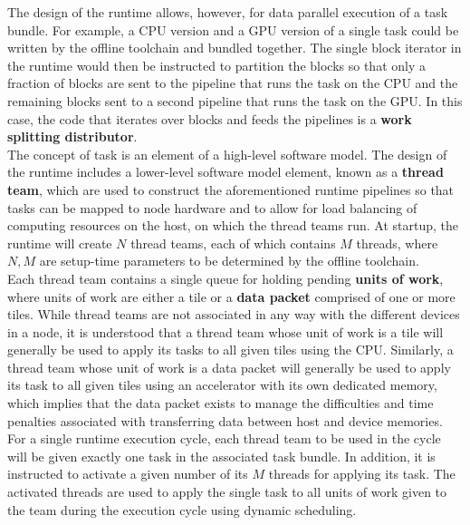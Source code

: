 \documentclass{article}
\begin{document}
The design of the runtime allows, however, for data parallel execution of a task
bundle.  For example, a CPU version and a GPU version of a single task could
be written by the offline toolchain and bundled together.  The single block
iterator in the runtime would then be instructed to partition the blocks so that
only a fraction of blocks are sent to the pipeline that runs the task on the
CPU and the remaining blocks sent to a second pipeline that runs the task on the
GPU.  In this case, the code that iterates over blocks and feeds the pipelines
is a \textbf{work splitting distributor}.\\

The concept of task is an element of a high-level software model.  The design of
the runtime includes a lower-level software model element, known as a
\textbf{thread team}, which are used to construct the aforementioned runtime
pipelines so that tasks can be mapped to node hardware and to allow for load
balancing of computing resources on the host, on which the thread teams run.
At startup, the runtime will create $N$ thread teams, each of which contains $M$
threads, where $N, M$ are setup-time parameters to be determined by the offline
toolchain.\\

Each thread team contains a single queue for holding pending \textbf{units of
work}, where units of work are either a tile or a \textbf{data packet} comprised
of one or more tiles.  While thread teams are not associated in any way with the
different devices in a node, it is understood that a thread team whose unit of
work is a tile will generally be used to apply its tasks to all given tiles
using the CPU.  Similarly, a thread team whose unit of work is a data packet
will generally be used to apply its task to all given tiles using an
accelerator with its own dedicated memory, which implies that the data packet
exists to manage the difficulties and time penalties associated with
transferring data between host and device memories.\\

For a single runtime execution cycle, each thread team to be used in the cycle
will be given exactly one task in the associated task bundle.  In addition, it
is instructed to activate a given number of its $M$ threads for applying its
task.  The activated threads are used to apply the single task to all units of
work given to the team during the execution cycle using dynamic scheduling.\\
\end{document}
